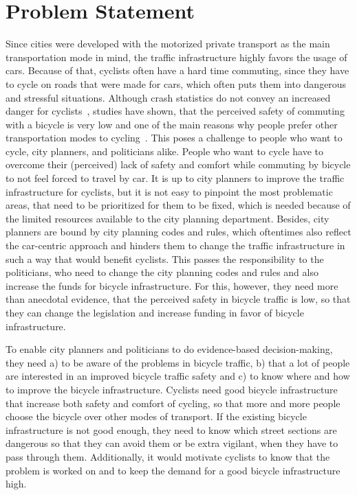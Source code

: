 \section{Problem Statement}
\label{sec:problem}
Since cities were developed with the motorized private transport as the main transportation mode in mind, the traffic infrastructure highly favors the usage of cars.
Because of that, cyclists often have a hard time commuting, since they have to cycle on roads that were made for cars, which often puts them into dangerous and stressful situations.
Although crash statistics do not convey an increased danger for cyclists~\cite{juhra2012bicycle}, studies have shown, that the perceived safety of commuting with a bicycle is very low and one of the main reasons why people prefer other transportation modes to cycling~\cite{horton2016fear}.
This poses a challenge to people who want to cycle, city planners, and politicians alike.
People who want to cycle have to overcome their (perceived) lack of safety and comfort while commuting by bicycle to not feel forced to travel by car. 
It is up to city planners to improve the traffic infrastructure for cyclists, but it is not easy to pinpoint the most problematic areas, that need to be prioritized for them to be fixed, which is needed because of the limited resources available to the city planning department.
Besides, city planners are bound by city planning codes and rules, which oftentimes also reflect the car-centric approach and hinders them to change the traffic infrastructure in such a way that would benefit cyclists.
This passes the responsibility to the politicians, who need to change the city planning codes and rules and also increase the funds for bicycle infrastructure.
For this, however, they need more than anecdotal evidence, that the perceived safety in bicycle traffic is low, so that they can change the legislation and increase funding in favor of bicycle infrastructure.

To enable city planners and politicians to do evidence-based decision-making, they need a) to be aware of the problems in bicycle traffic, b) that a lot of people are interested in an improved bicycle traffic safety and c) to know where and how to improve the bicycle infrastructure.
Cyclists need good bicycle infrastructure that increase both safety and comfort of cycling, so that more and more people choose the bicycle over other modes of transport.
If the existing bicycle infrastructure is not good enough, they need to know which street sections are dangerous so that they can avoid them or be extra vigilant, when they have to pass through them.
Additionally, it would motivate cyclists to know that the problem is worked on and to keep the demand for a good bicycle infrastructure high. 


